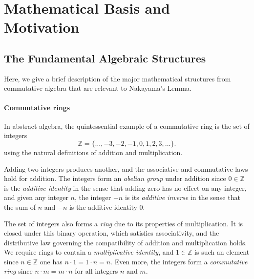 \documentclass{article}
\begin{document}

\section{Mathematical Basis and Motivation}
\subsection{The Fundamental Algebraic Structures}
Here, we give a brief description of the major mathematical structures from
commutative algebra that are relevant to Nakayama's Lemma.

\paragraph{Commutative rings}
In abstract algebra, the quintessential example of a commutative ring is the
set of integers
\[\mathbb{Z} = \{ \ldots, -3, -2, -1, 0, 1, 2, 3, \ldots \}.\]
using the natural definitions of addition and multiplication.

Adding two integers produces another, and the associative and commutative laws
hold for addition. The integers form an \emph{abelian group} under addition
since $0 \in \mathbb{Z}$ is the \emph{additive identity} in the sense that
adding zero has no effect on any integer, and given any integer $n$, the
integer $-n$ is its \emph{additive inverse} in the sense that the sum of $n$
and $-n$ is the additive identity $0$. 

The set of integers also forms a \emph{ring} due to its properties of
multiplication. It is closed under this binary operation, which satisfies
associativity, and the distributive law governing the compatibility of addition
and multiplication holds.  We require rings to contain a \emph{multiplicative
identity}, and $1 \in \mathbb{Z}$ is such an element since $n \in \mathbb{Z}$
one has $n \cdot 1 = 1 \cdot n = n$. Even more, the integers form a
\emph{commutative ring} since $n \cdot m = m \cdot n$ for all integers $n$ and
$m$. 
\end{document}
